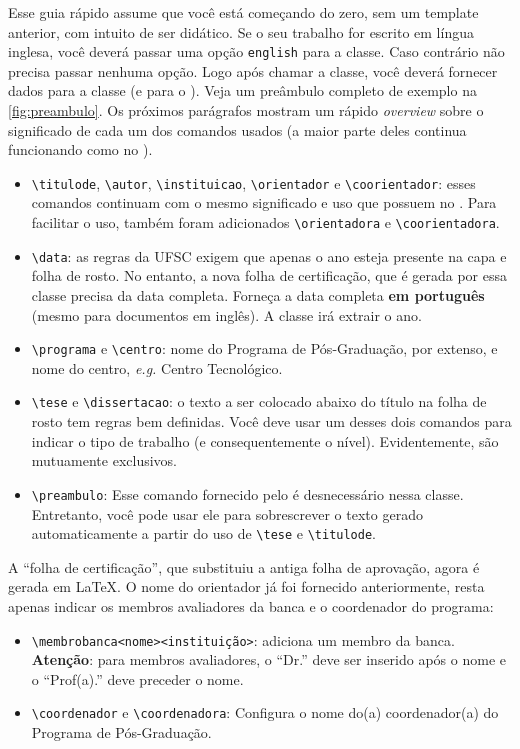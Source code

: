 \documentclass[embeddedlogo]{../ufsc-thesis-rn46-2019}
\newcommand{\lacmd}[1]{\texttt{\textbackslash{}#1}}
\begin{document}
Esse guia rápido assume que você está começando do zero, sem um template
anterior, com intuito de ser didático. Se o seu trabalho for escrito em língua
inglesa, você deverá passar uma opção \texttt{english} para a classe. Caso
contrário não precisa passar nenhuma opção. Logo após chamar a classe, você
deverá fornecer dados para a classe (e para o \abnTeX). Veja um preâmbulo
completo de exemplo na \autoref{fig:preambulo}. Os próximos parágrafos mostram um
rápido \emph{overview} sobre o significado de cada um dos comandos usados (a
maior parte deles continua funcionando como no \abnTeX).

\begin{itemize}
  \item \lacmd{titulode}, \lacmd{autor}, \lacmd{instituicao}, \lacmd{orientador}
e \lacmd{coorientador}: esses comandos continuam com o mesmo significado e uso
que possuem no \abnTeX. Para facilitar o uso, também foram adicionados
\lacmd{orientadora} e \lacmd{coorientadora}.
  \item \lacmd{data}: as regras da UFSC exigem que apenas o ano esteja presente
na capa e folha de rosto. No entanto, a nova folha de certificação, que é gerada
por essa classe precisa da data completa. Forneça a data completa \textbf{em
português} (mesmo para documentos em inglês). A classe irá extrair o ano.
  \item \lacmd{programa} e \lacmd{centro}: nome do Programa de Pós-Graduação,
por extenso, e nome do centro, \emph{e.g.}  Centro Tecnológico.
  \item \lacmd{tese} e \lacmd{dissertacao}: o texto a ser colocado abaixo do
título na folha de rosto tem regras bem definidas. Você deve usar um desses dois
comandos para indicar o tipo de trabalho (e consequentemente o nível).
Evidentemente, são mutuamente exclusivos.
  \item \lacmd{preambulo}: Esse comando fornecido pelo \abnTeX{} é desnecessário
nessa classe. Entretanto, você pode usar ele para sobrescrever o texto gerado
automaticamente a partir do uso de \lacmd{tese} e \lacmd{titulode}.
\end{itemize}

A ``folha de certificação'', que substituiu a antiga folha de aprovação, agora
é gerada em \LaTeX. O nome do orientador já foi fornecido anteriormente, resta
apenas indicar os membros avaliadores da banca e o coordenador do programa:
\begin{itemize}
  \item \lacmd{membrobanca{<nome>}{<instituição>}}: adiciona um membro da banca.
\textbf{Atenção}: para membros avaliadores, o ``Dr.'' deve ser inserido após o
nome e o ``Prof(a).'' deve preceder o nome.
  \item \lacmd{coordenador} e \lacmd{coordenadora}: Configura o nome do(a)
coordenador(a) do Programa de Pós-Graduação.
\end{itemize}
\end{document}
